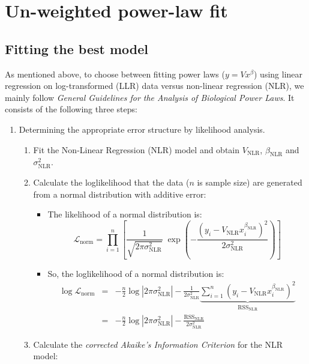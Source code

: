 \documentclass[12pt]{article}
\begin{document}
\section{Un-weighted power-law fit}\label{sec:unw}

\subsection{Fitting the best model}

As mentioned above, to choose between fitting power laws ($y=Vx^\beta$) using linear regression on log-transformed (LLR) data versus non-linear regression (NLR), we mainly follow \emph{General Guidelines for the Analysis of Biological Power Laws}\cite{ecology}. It consists of the following three steps:
\begin{enumerate}
    \item Determining the appropriate error structure by likelihood analysis.
    \begin{enumerate}
        \item Fit the Non-Linear Regression (NLR) model and obtain $V_\text{NLR}$, $\beta_\text{NLR}$ and $\sigma_\text{NLR}^2$.
        \item Calculate the loglikelihood that the data ($n$ is sample size) are generated from a normal distribution with additive error:
        \begin{itemize}
            \item The likelihood of a normal distribution is:  
            $$\mathcal{L}_\text{norm} = \prod_{i=1}^n\left[\frac{1}{\sqrt{2\pi\sigma^2_\text{NLR}}}\;\exp{\left(-\frac{\left(y_i-V_\text{NLR}x_i^{\beta_\text{NLR}}\right)^2}{2\sigma^2_\text{NLR}}\right)}\right]$$
            \item So, the loglikelihood of a normal distribution is:
            \begin{eqnarray*}
                \log\mathcal{L}_\text{norm} &=& -\frac{n}{2}\log\left|2\pi\sigma^2_\text{NLR}\right| - \frac{1}{2\sigma^2_\text{NLR}}\underbrace{\sum_{i=1}^n\left(y_i-V_\text{NLR}x_i^{\beta_\text{NLR}}\right)^2}_{\mathrm{RSS
                }_\text{NLR}}\\
                &=& -\frac{n}{2}\log\left|2\pi\sigma^2_\text{NLR}\right|-\frac{\mathrm{RSS}_\text{NLR}}{2\sigma^2_\text{NLR}}
            \end{eqnarray*}
        \end{itemize}
        \item Calculate the \emph{corrected Akaike's Information Criterion} for the NLR model:

\end{enumerate}
\end{enumerate}
\end{document}
